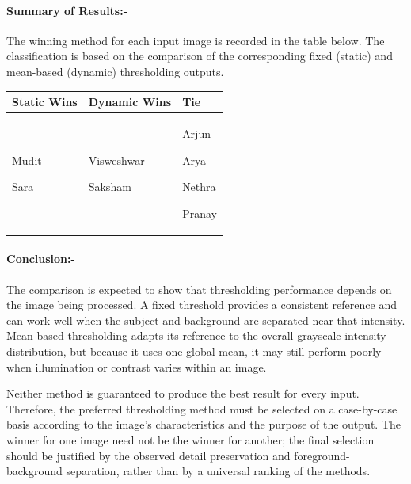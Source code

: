 \paragraph{Summary of Results:-}

The winning method for each input image is recorded in the table below. The classification is based on the comparison of the corresponding fixed (static) and mean-based (dynamic) thresholding outputs.

\begin{center}
\renewcommand{\arraystretch}{1.4}
\setlength{\tabcolsep}{5pt}

\begin{tabular}{|>{\centering\arraybackslash}p{}|
                >{\centering\arraybackslash}p{}|
                >{\centering\arraybackslash}p{}|}
\hline
\textbf{Static Wins} &
\textbf{Dynamic Wins} &
\textbf{Tie} \\
\hline
Mudit\par Sara &
Visweshwar\par Saksham &
Arjun\par Arya\par Nethra\par Pranay \\
\hline
\end{tabular}
\end{center}

\paragraph{Conclusion:-}

The comparison is expected to show that thresholding performance depends on the image being processed. A fixed threshold provides a consistent reference and can work well when the subject and background are separated near that intensity. Mean-based thresholding adapts its reference to the overall grayscale intensity distribution, but because it uses one global mean, it may still perform poorly when illumination or contrast varies within an image.

Neither method is guaranteed to produce the best result for every input. Therefore, the preferred thresholding method must be selected on a case-by-case basis according to the image's characteristics and the purpose of the output. The winner for one image need not be the winner for another; the final selection should be justified by the observed detail preservation and foreground-background separation, rather than by a universal ranking of the methods.

